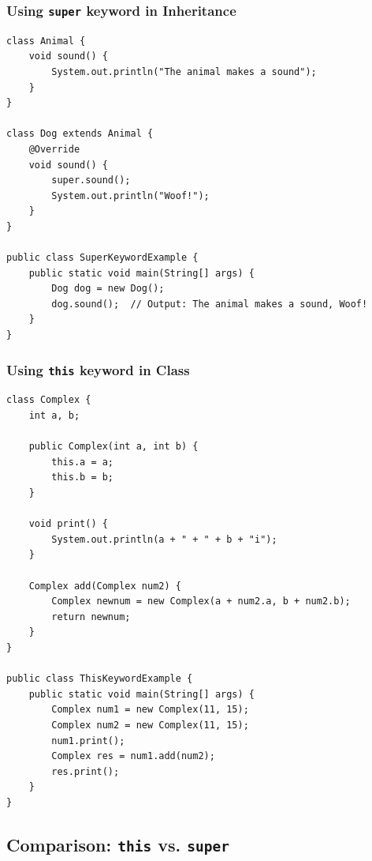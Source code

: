 \documentclass{book}
\begin{document}
\subsubsection{Using \texttt{super} keyword in Inheritance}

\begin{verbatim}
class Animal {
    void sound() {
        System.out.println("The animal makes a sound");
    }
}

class Dog extends Animal {
    @Override
    void sound() {
        super.sound();
        System.out.println("Woof!");
    }
}

public class SuperKeywordExample {
    public static void main(String[] args) {
        Dog dog = new Dog();
        dog.sound();  // Output: The animal makes a sound, Woof!
    }
}
\end{verbatim}


\subsubsection{Using \texttt{this} keyword in Class}

\begin{verbatim}
class Complex {
    int a, b;

    public Complex(int a, int b) {
        this.a = a;
        this.b = b;
    }

    void print() {
        System.out.println(a + " + " + b + "i");
    }

    Complex add(Complex num2) {
        Complex newnum = new Complex(a + num2.a, b + num2.b);
        return newnum;
    }
}

public class ThisKeywordExample {
    public static void main(String[] args) {
        Complex num1 = new Complex(11, 15);
        Complex num2 = new Complex(11, 15);
        num1.print();
        Complex res = num1.add(num2);
        res.print();
    }
}
\end{verbatim}

\subsection{Comparison: \texttt{this} vs. \texttt{super}}
\end{document}
